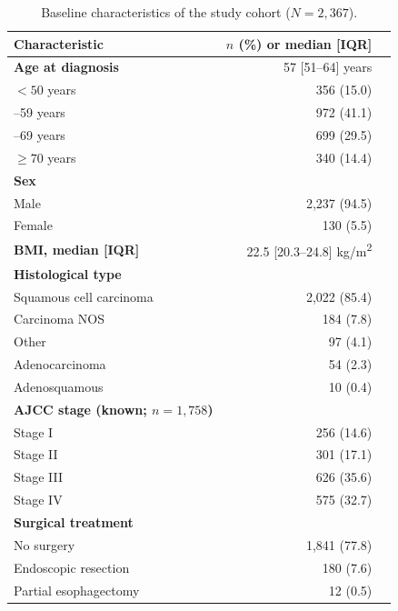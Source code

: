 \documentclass[12pt,a4paper]{article}
\begin{document}
\clearpage

\begin{table}[H]
  \centering
  \caption{Baseline characteristics of the study cohort ($N = 2{,}367$).}
  \label{tab:baseline}
  \begin{tabular}{lrr}
    \toprule
    Characteristic & $n$ (\%) or median [IQR] \\
    \midrule
    \textbf{Age at diagnosis} & 57 [51--64] years \\
    \quad $< 50$ years         & 356 (15.0) \\
    \quad 50--59 years          & 972 (41.1) \\
    \quad 60--69 years          & 699 (29.5) \\
    \quad $\geq 70$ years       & 340 (14.4) \\
    \addlinespace
    \textbf{Sex} & \\
    \quad Male    & 2,237 (94.5) \\
    \quad Female  & 130 (5.5) \\
    \addlinespace
    \textbf{BMI, median [IQR]} & 22.5 [20.3--24.8] kg/m\textsuperscript{2} \\
    \addlinespace
    \textbf{Histological type} & \\
    \quad Squamous cell carcinoma & 2,022 (85.4) \\
    \quad Carcinoma NOS           & 184 (7.8) \\
    \quad Other                   & 97 (4.1) \\
    \quad Adenocarcinoma          & 54 (2.3) \\
    \quad Adenosquamous           & 10 (0.4) \\
    \addlinespace
    \textbf{AJCC stage (known; $n = 1{,}758$)} & \\
    \quad Stage I   & 256 (14.6) \\
    \quad Stage II  & 301 (17.1) \\
    \quad Stage III & 626 (35.6) \\
    \quad Stage IV  & 575 (32.7) \\
    \addlinespace
    \textbf{Surgical treatment} & \\
    \quad No surgery              & 1,841 (77.8) \\
    \quad Endoscopic resection    & 180 (7.6) \\
    \quad Partial esophagectomy   & 12 (0.5) \\

\end{tabular}
\end{table}
\end{document}
